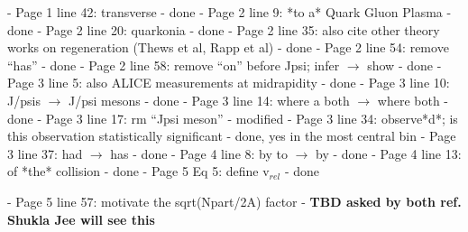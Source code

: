 \documentclass[a4paper,11pt]{article}
\begin{document}
- Page 1 line 42: transverse \newline
- {\color{blue} done} \newline
- Page 2 line 9: *to a* Quark Gluon Plasma \newline 
- {\color{blue} done} \newline
- Page 2 line 20: quarkonia \newline
- {\color{blue} done} \newline
- Page 2 line 35: also cite other theory works on regeneration (Thews et al, Rapp et al) \newline
- {\color{blue} done} \newline
- Page 2 line 54: remove “has” \newline
- {\color{blue} done} \newline
- Page 2 line 58: remove “on” before Jpsi; infer $\rightarrow$ show \newline
- {\color{blue} done} \newline
- Page 3 line 5: also ALICE measurements at midrapidity \newline 
- {\color{blue} done} \newline
- Page 3 line 10: J/psis $\rightarrow$ J/psi mesons \newline
- {\color{blue} done} \newline
- Page 3 line 14: where a both $\rightarrow$ where both \newline
- {\color{blue} done} \newline
- Page 3 line 17: rm “Jpsi meson” \newline
- {\color{blue} modified} \newline
- Page 3 line 34: observe*d*; is this observation statistically significant \newline
- {\color{blue} done, yes in the most central bin}\newline
- Page 3 line 37: had $\rightarrow$ has \newline
- {\color{blue} done}\newline
- Page 4 line 8: by to $\rightarrow$ by \newline
- {\color{blue} done}\newline
- Page 4 line 13: of *the* collision \newline
- {\color{blue} done}\newline
- Page 5 Eq 5: define v$_{rel}$ \newline
- {\color{blue} done}\newline

- Page 5 line 57: motivate the sqrt(Npart/2A) factor \newline
- {\color{red} \textbf{TBD asked by both ref. Shukla Jee will see this}}\newline
\end{document}
